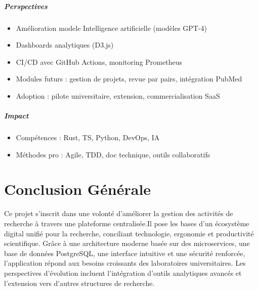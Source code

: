 \documentclass[12pt]{rapportPfe}
\begin{document}
\paragraph{Perspectives}
\begin{itemize}
    \item Amélioration modele Intelligence artificielle (modèles GPT-4)
    \item Dashboards analytiques (D3.js)
    \item CI/CD avec GitHub Actions, monitoring Prometheus
    \item Modules futurs : gestion de projets, revue par pairs, intégration PubMed
    \item Adoption : pilote universitaire, extension, commercialisation SaaS
\end{itemize}

\paragraph{Impact}
\begin{itemize}
    \item Compétences : Rust, TS, Python, DevOps, IA
    \item Méthodes pro : Agile, TDD, doc technique, outils collaboratifs
\end{itemize}


\newpage
\chapter*{Conclusion Générale}
Ce projet s’inscrit dans une volonté d’améliorer la gestion des activités de recherche à travers une plateforme centralisée.Il pose les bases d'un écosystème digital unifié pour la recherche, conciliant technologie, ergonomie et productivité scientifique. Grâce à une architecture moderne basée sur des microservices, une base de données PostgreSQL, une interface intuitive et une sécurité renforcée, l’application répond aux besoins croissants des laboratoires universitaires. Les perspectives d’évolution incluent l’intégration d’outils analytiques avancés et l’extension vers d’autres structures de recherche.
\end{document}
